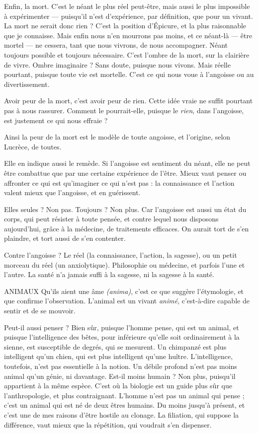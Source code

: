 Enfin, la mort. C’est le néant le plus réel peut-être, mais aussi le plus
impossible à expérimenter — puisqu'il n’est d'expérience, par définition, que
pour un vivant. La mort ne serait donc rien ? C’est la position d’Épicure, et la
plus raisonnable que je connaisse. Mais enfin nous n’en mourrons pas moins,
et ce néant-là — être mortel — ne cessera, tant que nous vivrons, de nous accompagner.
Néant toujours possible et toujours nécessaire. C’est l’ombre de la
mort, sur la clairière de vivre. Ombre imaginaire ? Sans doute, puisque nous
vivons. Mais réelle pourtant, puisque toute vie est mortelle. C’est ce qui nous
voue à l’angoisse ou au divertissement.

Avoir peur de la mort, c’est avoir peur de rien. Cette idée vraie ne suffit
pourtant pas à nous rassurer. Comment le pourrait-elle, puisque le {\it rien}, dans
l'angoisse, est justement ce qui nous effraie ?

Ainsi la peur de la mort est le modèle de toute angoisse, et l’origine, selon
Lucrèce, de toutes.

Elle en indique aussi le remède. Si l'angoisse est sentiment du néant, elle ne
peut être combattue que par une certaine expérience de l'être. Mieux vaut
penser ou affronter ce qui est qu’imaginer ce qui n’est pas : la connaissance et
l’action valent mieux que l’angoisse, et en guérissent.

Elles seules ? Non pas. Toujours ? Non plus. Car l'angoisse est aussi un état
du corps, qui peut résister à toute pensée, et contre lequel nous disposons
aujourd’hui, grâce à la médecine, de traitements efficaces. On aurait tort de
s’en plaindre, et tort aussi de s’en contenter.

Contre l’angoisse ? Le réel (la connaissance, l’action, la sagesse), ou un petit
morceau du réel (un anxiolytique). Philosophie ou médecine, et parfois l’une et
l’autre. La santé n’a jamais suffi à la sagesse, ni la sagesse à la santé.

ANIMAUX Qu'ils aient une âme {\it (anima)}, c’est ce que suggère l’étymologie,
et que confirme l'observation. L'animal est un vivant {\it animé},
c’est-à-dire capable de sentir et de se mouvoir.

Peut-il aussi penser ? Bien sûr, puisque l’homme pense, qui est un animal,
et puisque l'intelligence des bêtes, pour inférieure qu’elle soit ordinairement à
la sienne, est susceptible de degrés, qui se mesurent. Un chimpanzé est plus
intelligent qu’un chien, qui est plus intelligent qu’une huître. L'intelligence,
toutefois, n’est pas essentielle à la notion. Un débile profond n’est pas moins
animal qu’un génie, ni davantage. Est-il moins humain ? Non plus, puisqu'il
appartient à la même espèce. C’est où la biologie est un guide plus sûr que
l'anthropologie, et plus contraignant. L'homme n’est pas un animal qui pense ;
c’est un animal qui est né de deux êtres humains. Du moins jusqu’à présent, et
c’est une de mes raisons d’être hostile au clonage. La filiation, qui suppose la
différence, vaut mieux que la répétition, qui voudrait s’en dispenser.

